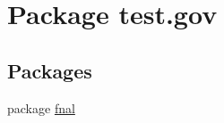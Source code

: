 \hypertarget{namespacetest_1_1gov}{\section{Package test.\-gov}
\label{namespacetest_1_1gov}
}
\subsection*{Packages}
\begin{DoxyCompactItemize}
\item 
package \hyperlink{namespacetest_1_1gov_1_1fnal}{fnal}
\end{DoxyCompactItemize}
